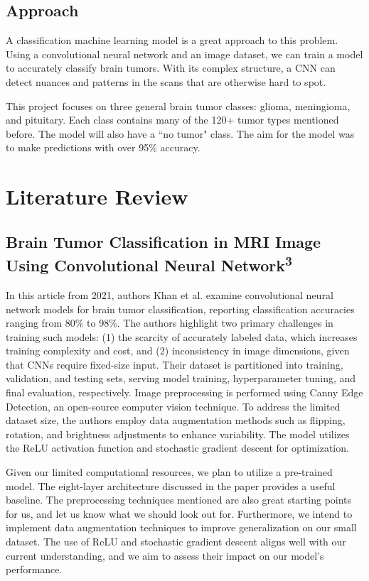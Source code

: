\documentclass[conference]{IEEEtran}
\begin{document}
\subsection{\large Approach}

A classification machine learning model is a great approach to this problem. Using a convolutional neural network and an image dataset, we can train a model to accurately classify brain tumors. With its complex structure, a CNN can detect nuances and patterns in the scans that are otherwise hard to spot. 

This project focuses on three general brain tumor classes: glioma, meningioma, and pituitary. Each class contains many of the 120+ tumor types mentioned before. The model will also have a ``no tumor" class. The aim for the model was to make predictions with over 95\% accuracy.

\section{\large Literature Review}

\subsection{\large Brain Tumor Classification in MRI Image Using Convolutional Neural Network\textsuperscript{3}}

In this article from 2021, authors Khan et al. examine convolutional neural network models for brain tumor classification, reporting classification accuracies ranging from 80\% to 98\%. The authors highlight two primary challenges in training such models: (1) the scarcity of accurately labeled data, which increases training complexity and cost, and (2) inconsistency in image dimensions, given that CNNs require fixed-size input. Their dataset is partitioned into training, validation, and testing sets, serving model training, hyperparameter tuning, and final evaluation, respectively. Image preprocessing is performed using Canny Edge Detection, an open-source computer vision technique. To address the limited dataset size, the authors employ data augmentation methods such as flipping, rotation, and brightness adjustments to enhance variability. The model utilizes the ReLU activation function and stochastic gradient descent for optimization.

Given our limited computational resources, we plan to utilize a pre-trained model. The eight-layer architecture discussed in the paper provides a useful baseline. The preprocessing techniques mentioned are also great starting points for us, and let us know what we should look out for. Furthermore, we intend to implement data augmentation techniques to improve generalization on our small dataset. The use of ReLU and stochastic gradient descent aligns well with our current understanding, and we aim to assess their impact on our model's performance.
\end{document}
